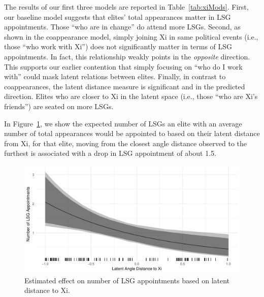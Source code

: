 \documentclass[11pt,english]{article}
\begin{document}
\begin{flushleft}
The results of our first three models are reported in Table~\ref{tab:xiMods}. First, our baseline model suggests that elites' total appearances matter in LSG appointments. Those ``who are in change'' do attend more LSGs. Second, as shown in the coappearance model, simply joining Xi in same political events (i.e., those ``who work with Xi'') does not significantly matter in terms of LSG appointments. In fact, this relationship weakly points in the \emph{opposite} direction. This supports our earlier contention that simply focusing on ``who do I work with'' could mask latent relations between elites. Finally, in contrast to coappearances, the latent distance measure is significant and in the predicted direction. Elites who are closer to Xi in the latent space (i.e., those ``who are Xi's friends'') are seated on more LSGs.

In Figure~\ref{fig:effects}, we show the expected number of LSGs an elite with an average number of total appearances would be appointed to based on their latent distance from Xi, for that elite, moving from the closest angle distance observed to the furthest is associated with a drop in LSG appointment of about 1.5.

\noindent \begin{center}
\begin{figure}[H]
\noindent \begin{centering}
\includegraphics[width=1\textwidth]{effects}
\par\end{centering}
\caption{Estimated effect on number of LSG appointments based on latent distance to Xi.}
\label{fig:effects}
\end{figure}
\par\end{center}


\end{flushleft}
\end{document}
